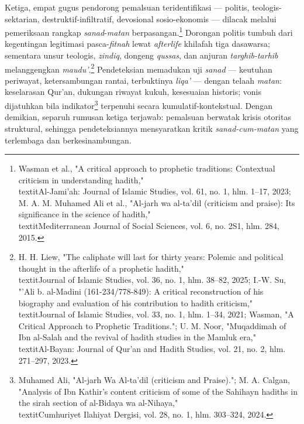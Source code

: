 Ketiga, empat gugus pendorong pemalsuan teridentifikasi --- politis, teologis-sektarian, destruktif-infiltratif, devosional sosio-ekonomis --- dilacak melalui pemeriksaan rangkap \textit{sanad}-\textit{matan} berpasangan.\footnote{Wasman et al., "A critical approach to prophetic traditions: Contextual criticism in understanding hadith," \\textit{Al-Jami'ah: Journal of Islamic Studies}, vol. 61, no. 1, hlm. 1--17, 2023; M. A. M. Muhamed Ali et al., "Al-jarh wa al-ta'dil (criticism and praise): Its significance in the science of hadith," \\textit{Mediterranean Journal of Social Sciences}, vol. 6, no. 2S1, hlm. 284, 2015.} Dorongan politis tumbuh dari kegentingan legitimasi pasca-\textit{fitnah} lewat \textit{afterlife} khilafah tiga dasawarsa; sementara unsur teologis, \textit{zindiq}, dongeng \textit{qussas}, dan anjuran \textit{targhib-tarhib} melanggengkan \textit{maudu'}.\footnote{H. H. Liew, "The caliphate will last for thirty years: Polemic and political thought in the afterlife of a prophetic hadith," \\textit{Journal of Islamic Studies}, vol. 36, no. 1, hlm. 38--82, 2025; I.-W. Su, "'Ali b. al-Madini (161-234/778-849): A critical reconstruction of his biography and evaluation of his contribution to hadith criticism," \\textit{Journal of Islamic Studies}, vol. 33, no. 1, hlm. 1--34, 2021; Wasman, "A Critical Approach to Prophetic Traditions."; U. M. Noor, "Muqaddimah of Ibn al-Salah and the revival of hadith studies in the Mamluk era," \\textit{Al-Bayan: Journal of Qur'an and Hadith Studies}, vol. 21, no. 2, hlm. 271--297, 2023.} Pendeteksian memadukan uji \textit{sanad} --- keutuhan periwayat, ketersambungan rantai, terbuktinya \textit{liqa'} --- dengan telaah \textit{matan}: keselarasan Qur'an, dukungan riwayat kukuh, kesesuaian historis; vonis dijatuhkan bila indikator\footnote{Muhamed Ali, "Al-jarh Wa Al-ta'dil (criticism and Praise)."; M. A. Calgan, "Analysis of Ibn Kathir's content criticism of some of the Sahihayn hadiths in the sirah section of al-Bidaya wa al-Nihaya," \\textit{Cumhuriyet Ilahiyat Dergisi}, vol. 28, no. 1, hlm. 303--324, 2024.} terpenuhi secara kumulatif-kontekstual. Dengan demikian, separuh rumusan ketiga terjawab: pemalsuan berwatak krisis otoritas struktural, sehingga pendeteksiannya mensyaratkan kritik \textit{sanad-cum-matan} yang terlembaga dan berkesinambungan.

